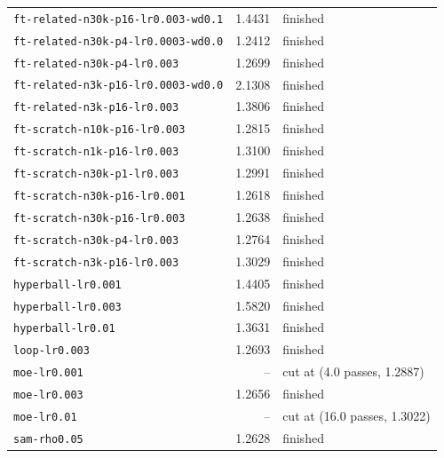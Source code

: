 \begin{longtable}{lrl}
\texttt{ft-related-n30k-p16-lr0.003-wd0.1} & 1.4431 & finished \\
\texttt{ft-related-n30k-p4-lr0.0003-wd0.0} & 1.2412 & finished \\
\texttt{ft-related-n30k-p4-lr0.003} & 1.2699 & finished \\
\texttt{ft-related-n3k-p16-lr0.0003-wd0.0} & 2.1308 & finished \\
\texttt{ft-related-n3k-p16-lr0.003} & 1.3806 & finished \\
\texttt{ft-scratch-n10k-p16-lr0.003} & 1.2815 & finished \\
\texttt{ft-scratch-n1k-p16-lr0.003} & 1.3100 & finished \\
\texttt{ft-scratch-n30k-p1-lr0.003} & 1.2991 & finished \\
\texttt{ft-scratch-n30k-p16-lr0.001} & 1.2618 & finished \\
\texttt{ft-scratch-n30k-p16-lr0.003} & 1.2638 & finished \\
\texttt{ft-scratch-n30k-p4-lr0.003} & 1.2764 & finished \\
\texttt{ft-scratch-n3k-p16-lr0.003} & 1.3029 & finished \\
\texttt{hyperball-lr0.001} & 1.4405 & finished \\
\texttt{hyperball-lr0.003} & 1.5820 & finished \\
\texttt{hyperball-lr0.01} & 1.3631 & finished \\
\texttt{loop-lr0.003} & 1.2693 & finished \\
\texttt{moe-lr0.001} & -- & cut at (4.0 passes, 1.2887) \\
\texttt{moe-lr0.003} & 1.2656 & finished \\
\texttt{moe-lr0.01} & -- & cut at (16.0 passes, 1.3022) \\
\texttt{sam-rho0.05} & 1.2628 & finished \\
\bottomrule\end{longtable}
